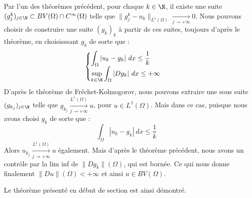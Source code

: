 Par l'un des théorèmes précédent, pour chaque $k \in \N$, il existe une suite $(g^k_j)_{j \in \N} \subset BV(\Omega) \cap C^{\infty}(\Omega)$ telle que $\|g^k_j - u_k\|_{L^1(\Omega)} \xrightarrow[j \to +\infty]{} 0$.
Nous pouvons choisir de construire une suite $(g_k)_k$ à partir de ces suites, toujours d'après le théorème, en choisisssant $g_k$ de sorte que :
$$\begin{cases}
    \displaystyle \int_{\Omega} |u_k - g_k| \ dx \leq \frac{1}{k} \\
    \displaystyle \underset{k \in \N}{\sup}\int_{\Omega} |Dg_k| \ dx \leq + \infty
\end{cases}$$
D'après le théorème de Fréchet-Kolmogorov, nous pouvons extraire une sous suite $(g_{k_j})_{j \in \N}$ telle que $g_{k_j} \xrightarrow[j \to +\infty]{L^1(\Omega)} u $, pour $u \in L^1(\Omega)$.
Mais dans ce cas, puisque nous avons choisi $g_k$ de sorte que :
$$\int_{\Omega} |u_k - g_k| \ dx \leq \frac{1}{k} $$
Alors $u_{k_j} \xrightarrow[j \to +\infty]{L^1(\Omega)}u$ également.
Mais d'après le théorème précédent, nous avons un contrôle par la lim inf de $\|Dg_k\|(\Omega)$, qui est bornée. Ce qui nous donne finalement $\|Du\|(\Omega) < +\infty$ et ainsi $u \in BV(\Omega)$. 

Le théorème présenté en début de section est ainsi démontré.